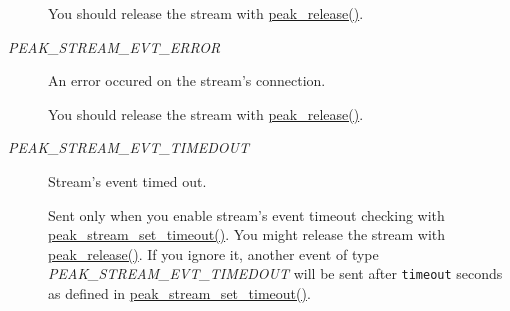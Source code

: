 \begin{Desc}
\begin{description}
You should release the stream with \hyperlink{group__alloc_ga7}{peak\_\-release()}. \item[{\em 
\hypertarget{group__stream_gga3a16}{
PEAK\_\-STREAM\_\-EVT\_\-ERROR}
\label{group__stream_gga3a16}
}]An error occured on the stream's connection. 

You should release the stream with \hyperlink{group__alloc_ga7}{peak\_\-release()}. \item[{\em 
\hypertarget{group__stream_gga3a17}{
PEAK\_\-STREAM\_\-EVT\_\-TIMEDOUT}
\label{group__stream_gga3a17}
}]Stream's event timed out. 

Sent only when you enable stream's event timeout checking with \hyperlink{group__stream__common_ga53}{peak\_\-stream\_\-set\_\-timeout()}. You might release the stream with \hyperlink{group__alloc_ga7}{peak\_\-release()}. If you ignore it, another event of type {\em PEAK\_\-STREAM\_\-EVT\_\-TIMEDOUT\/} will be sent after {\tt timeout} seconds as defined in \hyperlink{group__stream__common_ga53}{peak\_\-stream\_\-set\_\-timeout()}. \end{description}
\end{Desc}

